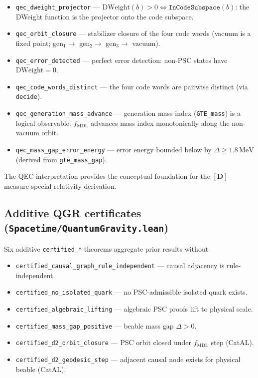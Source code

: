 \documentclass[11pt,a4paper]{article}
\theoremstyle{definition}
\begin{document}
\begin{itemize}[nosep]
\item \lstinline|qec_dweight_projector| --- $\mathrm{DWeight}(b) > 0
  \Leftrightarrow \texttt{InCodeSubspace}(b)$: the DWeight function is the
  projector onto the code subspace.
\item \lstinline|qec_orbit_closure| --- stabilizer closure of the four code words
  (vacuum is a fixed point; gen$_1 \to$ gen$_2 \to$ gen$_3 \to$ vacuum).
\item \lstinline|qec_error_detected| --- perfect error detection:
  non-PSC states have $\mathrm{DWeight} = 0$.
\item \lstinline|qec_code_words_distinct| --- the four code words are pairwise
  distinct (via \lstinline|decide|).
\item \lstinline|qec_generation_mass_advance| --- generation mass index
  (\lstinline|GTE_mass|) is a logical observable: $f_{\mathrm{MDL}}$ advances
  mass index monotonically along the non-vacuum orbit.
\item \lstinline|qec_mass_gap_error_energy| --- error energy bounded below by
  $\Delta \geq 1.8\,\mathrm{MeV}$ (derived from \lstinline|gte_mass_gap|).
\end{itemize}

The QEC interpretation provides the conceptual foundation for the
$[\mathbf{D}]$-measure special relativity derivation.

\subsection{Additive QGR certificates
  (\texttt{Spacetime/QuantumGravity.lean})}\label{subsec:qgr-certs}

Six additive \lstinline|certified_*| theorems aggregate prior results without

\begin{itemize}[nosep]
\item \lstinline|certified_causal_graph_rule_independent| — causal adjacency
  is rule-independent.
\item \lstinline|certified_no_isolated_quark| — no PSC-admissible isolated
  quark exists.
\item \lstinline|certified_algebraic_lifting| — algebraic PSC proofs lift to
  physical scale.
\item \lstinline|certified_mass_gap_positive| — beable mass gap $\Delta > 0$.
\item \lstinline|certified_d2_orbit_closure| — PSC orbit closed under
  $f_{\mathrm{MDL}}$ step (CatAL).
\item \lstinline|certified_d2_geodesic_step| — adjacent causal node exists for
  physical beable (CatAL).
\end{itemize}
\end{document}
